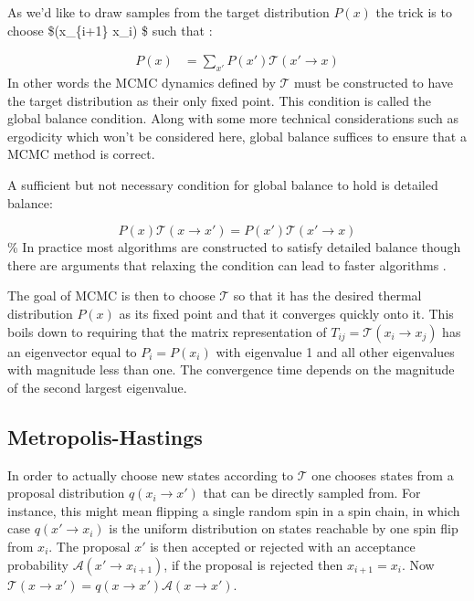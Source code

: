 As we'd like to draw samples from the target distribution \(P(x)\) the trick is to choose \$(x\_\{i+1\} \rightarrow x\_i) \$ such that :

\[\begin{aligned}
P(x) &= \sum_{x'} P(x') \mathcal{T}(x' \rightarrow x)
\end{aligned}
\] In other words the MCMC dynamics defined by \(\mathcal{T}\) must be constructed to have the target distribution as their only fixed point. This condition is called the global balance condition. Along with some more technical considerations such as ergodicity which won't be considered here, global balance suffices to ensure that a MCMC method is correct.

A sufficient but not necessary condition for global balance to hold is detailed balance:

\[
P(x) \mathcal{T}(x \rightarrow x') = P(x') \mathcal{T}(x' \rightarrow x)
\] \% In practice most algorithms are constructed to satisfy detailed balance though there are arguments that relaxing the condition can lead to faster algorithms \autocite{kapferSamplingPolytopeHarddisk2013}.

The goal of MCMC is then to choose \(\mathcal{T}\) so that it has the desired thermal distribution \(P(x)\) as its fixed point and that it converges quickly onto it. This boils down to requiring that the matrix representation of \(T_{ij} = \mathcal{T}(x_i \to x_j)\) has an eigenvector equal to \(P_i = P(x_i)\) with eigenvalue 1 and all other eigenvalues with magnitude less than one. The convergence time depends on the magnitude of the second largest eigenvalue.

\hypertarget{metropolis-hastings}{%
\subsection{Metropolis-Hastings}\label{metropolis-hastings}}

In order to actually choose new states according to \(\mathcal{T}\) one chooses states from a proposal distribution \(q(x_i \to x')\) that can be directly sampled from. For instance, this might mean flipping a single random spin in a spin chain, in which case \(q(x'\to x_i)\) is the uniform distribution on states reachable by one spin flip from \(x_i\). The proposal \(x'\) is then accepted or rejected with an acceptance probability \(\mathcal{A}(x'\to x_{i+1})\), if the proposal is rejected then \(x_{i+1} = x_{i}\). Now \(\mathcal{T}(x\to x') = q(x\to x')\mathcal{A}(x \to x')\).

